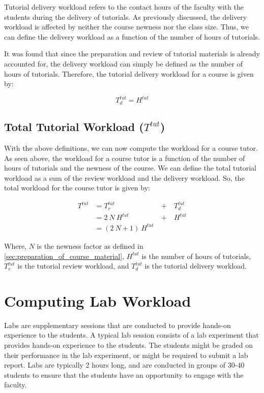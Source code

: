Tutorial delivery workload refers to the contact hours of the faculty with the students during the delivery of tutorials. As previously discussed, the delivery workload is affected by neither the course newness nor the class size. Thus, we can define the delivery workload as a function of the number of hours of tutorials.

It was found that since the preparation and review of tutorial materials is already accounted for, the delivery workload can simply be defined as the number of hours of tutorials. Therefore, the tutorial delivery workload for a course is given by:

\begin{equation}
  \label{eqn:tutorial-delivery-workload}
  T_d^{tut} = H^{tut}
\end{equation}

\subsection{Total Tutorial Workload (\(T^{tut}\))}

With the above definitions, we can now compute the workload for a course tutor. As seen above, the workload for a course tutor is a function of the number of hours of tutorials and the newness of the course. We can define the total tutorial workload as a sum of the review workload and the delivery workload. So, the total workload for the course tutor is given by:

\begin{equation}
  \begin{aligned}
    T^{tut} & = T_r^{tut}           & \ +\  & T_d^{tut} \\
            & = 2\ N\ H^{tut}       & \ +\  & H^{tut}   \\
            & = (2\ N + 1)\ H^{tut}
  \end{aligned}
  \label{eqn:tutorial-workload}
\end{equation}

Where, \(N\) is the newness factor as defined in \autoref{sec:preparation_of_course_material}, \(H^{tut}\) is the number of hours of tutorials, \(T_r^{tut}\) is the tutorial review workload, and \(T_d^{tut}\) is the tutorial delivery workload.

\section{Computing Lab Workload}

Labs are supplementary sessions that are conducted to provide hands-on experience to the students. A typical lab session consists of a lab experiment that provides hands-on experience to the students. The students might be graded on their performance in the lab experiment, or might be required to submit a lab report. Labs are typically 2 hours long, and are conducted in groups of 30-40 students to ensure that the students have an opportunity to engage with the faculty.

